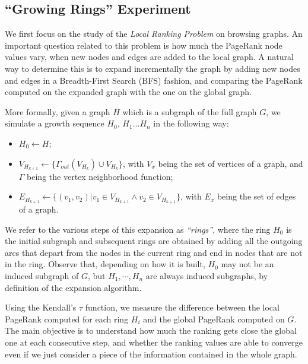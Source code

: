 \documentclass{sig-alternate-2013}
\begin{document}
\subsection{``Growing Rings'' Experiment} \label{sec:growingrings}
We first focus on the study of the {\it Local Ranking Problem} on browsing
graphs. An important question related to this problem is how much the PageRank
node values vary, when new nodes and edges are added to the local graph. A
natural way to determine this is to expand incrementally the graph by adding new
nodes and edges in a Breadth-First Search (BFS) fashion, and comparing the
PageRank computed on the expanded graph with the one on the global graph.

More formally, given a graph $H$ which is a subgraph of the full graph $G$, we
simulate a growth sequence $H_0$, $H_1 \dots H_n$ in the following way:
\begin{itemize}
  \item $H_0 \longleftarrow H$;
  \item $V_{H_{k+1}} \longleftarrow \{\Gamma_{out}(V_{H_k}) \cup V_{H_k}\}$, with $V_x$ being the set of vertices of a graph, and $\Gamma$ being the vertex neighborhood function;
  \item $E_{H_{k+1}} \longleftarrow \{(v_1, v_2) | v_1 \in V_{H_{k+1}} \wedge v_2 \in V_{H_{k+1}} \}$, with $E_x$ being the set of edges of a graph.
\end{itemize}
%
We refer to the various steps of this
expansion as \textit{``rings''}, where the ring $H_0$ is the initial subgraph
and subsequent rings are obtained by adding all the outgoing arcs that depart
from the nodes in the current ring and end in nodes that are not in the ring. Observe that, depending on how it is built, $H_0$ may not be
an induced subgraph of $G$, but $H_1, \cdots, H_n$ are always induced subgraphs, by
definition of the expansion algorithm.

Using the Kendall's $\tau$ function, we measure the difference between the local
PageRank computed for each ring $H_i$ and the global PageRank computed on $G$.
The main objective is to understand how much the ranking gets close the global
one at each consecutive step, and whether the ranking values are able to
converge even if we just consider a piece of the information contained in the
whole graph.
\end{document}
